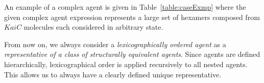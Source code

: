 \documentclass{entcs}
\renewcommand{\~}[0]{\texttildelow}
\begin{document}
An example of a complex agent is given in Table~\ref{table:caseExmp} where the given complex agent expression represents a large set of hexamers composed from $KaiC$ molecules each considered in arbitrary state.  

\begin{remark}
From now on, we always consider a \emph{lexicographically ordered agent} as a \emph{representative of a class of structurally equivalent agents}. Since agents are defined hierarchically, lexicographical order is applied recursively to all nested agents. This allows us to always have a clearly defined unique representative.
\end{remark}
\end{document}
